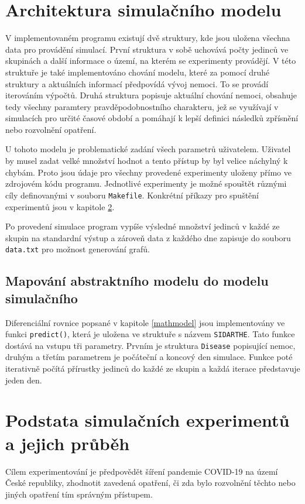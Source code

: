 \documentclass[a4paper,11pt]{article}
\begin{document}
	\section{Architektura simulačního modelu}
		V implementovaném programu existují dvě struktury, kde jsou uložena všechna data pro provádění simulací. První struktura v sobě uchovává počty jedinců ve skupinách a další informace o území, na kterém se experimenty provádějí. V této struktuře je také implementováno chování modelu, které za pomocí druhé struktury a aktuálních informací předpovídá vývoj nemoci. To se provádí iterováním výpočtů. Druhá struktura popisuje aktuální chování nemoci, obsahuje tedy všechny paramtery pravděpodobnostního charakteru, jež se využívají v simulacích pro určité časové období a pomáhají k lepší definici následků zpřísnění nebo rozvolnění opatření.
		
		U tohoto modelu je problematické zadání všech parametrů uživatelem. Uživatel by musel zadat velké množství hodnot a tento přístup by byl velice náchylný k chybám. Proto jsou údaje pro všechny provedené experimenty uloženy přímo ve zdrojovém kódu programu. Jednotlivé experimenty je možné spouštět různými cíly definovanými v souboru \texttt{Makefile}. Konkrétní příkazy pro spuštění experimentů jsou v kapitole \ref{experiments}.
		
		Po provedení simulace program vypíše výsledné množství jedinců v každé ze skupin na standardní výstup a zároveň data z každého dne zapisuje do souboru \texttt{data.txt} pro možnost generování grafů.
		
		\subsection{Mapování abstraktního modelu do modelu simulačního}
			Diferenciální rovnice popsané v kapitole \ref{mathmodel} jsou implementovány ve funkci \texttt{predict()}, která je uložena ve struktuře s názvem \texttt{SIDARTHE}. Tato funkce dostává na vstupu tři parametry. Prvním je struktura \texttt{Disease} popisující nemoc, druhým a třetím parametrem je počáteční a koncový den simulace. Funkce poté iterativně počítá přírustky jedinců do každé ze skupin a každá iterace představuje jeden den.
			
	\section{Podstata simulačních experimentů a jejich průběh}
	\label{experiments}
		Cílem experimentování je předpovědět šíření pandemie COVID-19 na území České republiky, zhodnotit zavedená opatření, či zda bylo rozvolnění těchto nebo jiných opatření tím správným přístupem.
		
\end{document}
